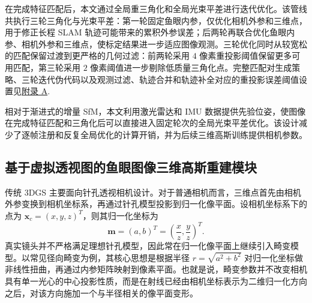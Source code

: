 在完成特征匹配后，本文通过全局重三角化和全局光束平差进行迭代优化。该管线共执行三轮三角化与光束平差：第一轮固定鱼眼内参，仅优化相机外参和三维点，用于修正长程 SLAM 轨迹可能带来的累积外参误差；后两轮再联合优化鱼眼内参、相机外参和三维点，使标定结果进一步适应图像观测。三轮优化同时从较宽松的匹配保留过渡到更严格的几何过滤：前两轮采用 \(4\) 像素重投影阈值保留更多可用匹配，第三轮采用 \(2\) 像素阈值进一步剔除低质量三角化点。完整匹配对生成策略、三轮迭代伪代码以及观测过滤、轨迹合并和轨迹补全对应的重投影误差阈值设置见\hyperref[app:fast-sfm]{附录 A}.

相对于渐进式的增量 SfM，本文利用激光雷达和 IMU 数据提供先验位姿，使图像在完成特征匹配和三角化后可以直接进入固定轮次的全局光束平差优化。该设计减少了逐帧注册和反复全局优化的计算开销，并为后续三维高斯训练提供相机参数。

\subsection{基于虚拟透视图的鱼眼图像三维高斯重建模块}
\label{sec:method-perspective-sampling}

传统 3DGS 主要面向针孔透视相机设计。对于普通相机而言，三维点首先由相机外参变换到相机坐标系，再通过针孔模型投影到归一化像平面。设相机坐标系下的点为 \(\mathbf{x}_c=(x,y,z)^{T}\)，则其归一化坐标为
\begin{equation}
    \label{equ:method-pinhole-normalized}
    \mathbf{m}=(a,b)^{T}=\left(\frac{x}{z},\frac{y}{z}\right)^{T}.
\end{equation}
真实镜头并不严格满足理想针孔模型，因此常在归一化像平面上继续引入畸变模型。以常见径向畸变为例，其核心思想是根据半径 \(r=\sqrt{a^2+b^2}\) 对归一化坐标做非线性扭曲，再通过内参矩阵映射到像素平面。也就是说，畸变参数并不改变相机具有单一光心的中心投影性质，而是在射线已经由相机坐标表示为二维归一化方向之后，对该方向施加一个与半径相关的像平面变形。

